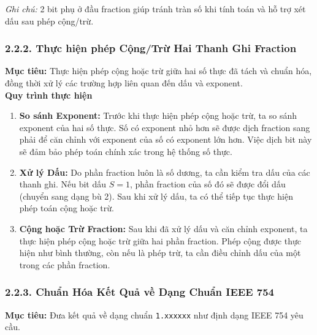 \noindent \textit{Ghi chú:} 2 bit phụ ở đầu fraction giúp tránh tràn số khi tính toán và hỗ trợ xét dấu sau phép cộng/trừ.

\subsubsection*{2.2.2. Thực hiện phép Cộng/Trừ Hai Thanh Ghi Fraction}
\textbf{Mục tiêu:} Thực hiện phép cộng hoặc trừ giữa hai số thực đã tách và chuẩn hóa, đồng thời xử lý các trường hợp liên quan đến dấu và exponent.\\

\textbf{Quy trình thực hiện}

\begin{enumerate}
    \item \textbf{So sánh Exponent:}  
    Trước khi thực hiện phép cộng hoặc trừ, ta so sánh exponent của hai số thực. Số có exponent nhỏ hơn sẽ được dịch fraction sang phải để căn chỉnh với exponent của số có exponent lớn hơn. Việc dịch bit này sẽ đảm bảo phép toán chính xác trong hệ thống số thực.
    
    \item \textbf{Xử lý Dấu:}  
    Do phần fraction luôn là số dương, ta cần kiểm tra dấu của các thanh ghi. Nếu bit dấu \( S = 1 \), phần fraction của số đó sẽ được đổi dấu (chuyển sang dạng bù 2). Sau khi xử lý dấu, ta có thể tiếp tục thực hiện phép toán cộng hoặc trừ.
    
    \item \textbf{Cộng hoặc Trừ Fraction:}  
    Sau khi đã xử lý dấu và căn chỉnh exponent, ta thực hiện phép cộng hoặc trừ giữa hai phần fraction. Phép cộng được thực hiện như bình thường, còn nếu là phép trừ, ta cần điều chỉnh dấu của một trong các phần fraction.
\end{enumerate}
\subsubsection*{2.2.3. Chuẩn Hóa Kết Quả về Dạng Chuẩn IEEE 754}

\textbf{Mục tiêu:} Đưa kết quả về dạng chuẩn \texttt{1.xxxxxx} như định dạng IEEE 754 yêu cầu.


